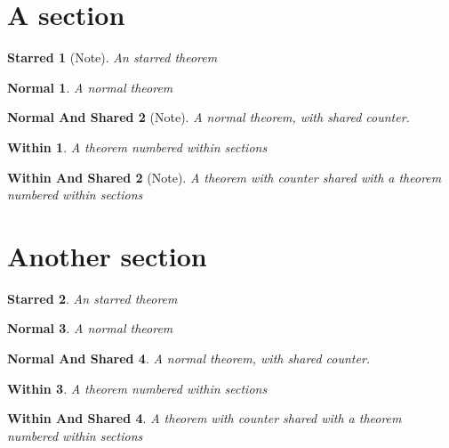 \documentclass{article}
\newtheorem*{starred}{Starred}
\newtheorem{normal}{Normal}
\newtheorem{normalshared}[normal]{Normal And Shared}
\theoremstyle{plain}
\newtheorem{within}{Within}[section]
\newtheorem{withinshared}[within]{Within And Shared}
\begin{document}
    \section{A section}
    \begin{starred}[Note]
        An starred theorem
    \end{starred}
    \begin{normal}
        A normal theorem
    \end{normal}
    \begin{normalshared}[Note]
        A normal theorem, with shared counter.
    \end{normalshared}
    \begin{within}
        A theorem numbered within sections
    \end{within}
    \begin{withinshared}[Note]
        A theorem with counter shared with a theorem numbered within sections
    \end{withinshared}
    \section{Another section}
    \begin{starred}
        An starred theorem
    \end{starred}
    \begin{normal}
        A normal theorem
    \end{normal}
    \begin{normalshared}
        A normal theorem, with shared counter.
    \end{normalshared}
    \begin{within}
        A theorem numbered within sections
    \end{within}
    \begin{withinshared}\label{T:1}
        A theorem with counter shared with a theorem numbered within sections
    \end{withinshared}
    
\end{document}
